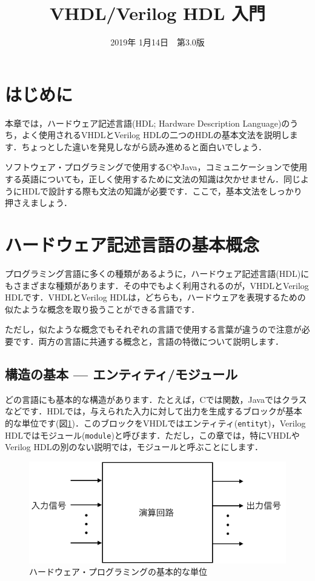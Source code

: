 \documentclass[a4paper,dvipdfmx]{jsarticle}
\begin{document}
\title{VHDL/Verilog HDL 入門}
\author{}
\date{2019年 1月14日~~第3.0版}
\maketitle

\section{はじめに}

本章では，ハードウェア記述言語(HDL; Hardware Description Language)のうち，よく使用されるVHDLとVerilog HDLの二つのHDLの基本文法を説明します．ちょっとした違いを発見しながら読み進めると面白いでしょう．

ソフトウェア・プログラミングで使用するCやJava，コミュニケーションで使用する英語についても，正しく使用するために文法の知識は欠かせません．同じようにHDLで設計する際も文法の知識が必要です．ここで，基本文法をしっかり押さえましょう．

\section{ハードウェア記述言語の基本概念}

プログラミング言語に多くの種類があるように，ハードウェア記述言語(HDL)にもさまざまな種類があります．その中でもよく利用されるのが，VHDLとVerilog HDLです．VHDLとVerilog HDLは，どちらも，ハードウェアを表現するための似たような概念を取り扱うことができる言語です．

ただし，似たような概念でもそれぞれの言語で使用する言葉が違うので注意が必要です．両方の言語に共通する概念と，言語の特徴について説明します．

\subsection{構造の基本 --- エンティティ/モジュール}

どの言語にも基本的な構造があります．たとえば，Cでは関数，Javaではクラスなどです．HDLでは，与えられた入力に対して出力を生成するブロックが基本的な単位です(図\ref{fig:design_unit})．このブロックをVHDLではエンティティ(\verb|entityt|)，Verilog HDLではモジュール(\verb|module|)と呼びます．ただし，この章では，特にVHDLやVerilog HDLの別のない説明では，モジュールと呼ぶことにします．

 \begin{figure}[H]
  \begin{center}
   \includegraphics[width=.5\textwidth]{chapter02_figures/design_unit.png}
  \end{center}
  \caption{ハードウェア・プログラミングの基本的な単位 \label{fig:design_unit}}
 \end{figure}
\end{document}
